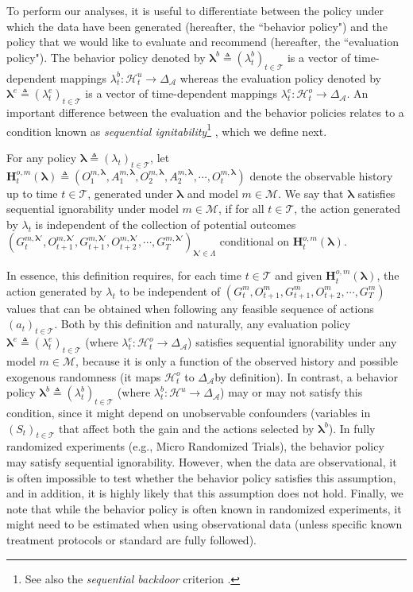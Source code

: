 \documentclass[opre,nonblindrev]{informs2}%
\newcommand{\teq}{\triangleq}
\newcommand{\1}{\hbox{\rm 1\kern-.35em 1}}
\newcommand{\MA}{\mathscr A}
\newcommand{\MT}{\mathscr T}
\newcommand{\MM}{\mathscr M}
\newcommand{\MH}{\mathscr H}
\newcommand{\blambda}{\boldsymbol{\lambda}}
\newcommand{\bH}{\mathbf{H}}
\begin{document}
To perform our analyses,  it is useful to differentiate between the policy under which the data have been generated (hereafter, the ``behavior policy") and the policy that we would like to evaluate and recommend (hereafter, the ``evaluation policy"). The behavior policy denoted by $\blambda^b\teq(\lambda_t^b)_{t\in\MT}$  is  a vector of time-dependent mappings $\lambda_t^b: \MH^u_t\to\Delta_\MA$ whereas the evaluation policy denoted by $\blambda^e\teq(\lambda_t^e)_{t\in\MT}$  is  a vector of time-dependent mappings $\lambda_t^e: \MH^o_t\to\Delta_\MA$. An important difference between the evaluation and the behavior policies relates to a condition known as {\em sequential ignitability}\footnote{See also the {\em sequential backdoor} criterion \citep{PearlRobins1995}.} \citep[see, e.g.,][]{Robins1986, Robins1997, Murphy2001, Murphy2003, Robins2004}, which we define next.



\begin{definition} For any policy $\blambda\teq(\lambda_t)_{t\in\MT}$, let $\bH^{o,m}_t (\blambda)\teq(O^{m, \blambda}_1, A^{m, \blambda}_1, O^{m, \blambda}_2, A^{m, \blambda}_2,\cdots, O^{m, \blambda}_t)$ denote the observable history up to time  $t\in\MT$, generated under  $\blambda$ and model $m\in\MM$.  We say that $\blambda$ satisfies sequential ignorability under model $m\in\MM$, if for all $t\in\MT$, the action generated
by $\lambda_t$ is independent of the collection of potential outcomes $(G^{m, \blambda'}_{t}, O^{m, \blambda'}_{t+1}, G^{m, \blambda'}_{t+1}, O^{m, \blambda'}_{t+2}, \cdots, G^{m, \blambda'}_{T})_{\blambda'\in\Lambda}$ conditional on $\bH^{o,m}_t (\blambda)$.
\end{definition}

In essence, this definition requires, for each time $t\in\MT$ and given $\bH^{o,m}_t (\blambda)$,   the action generated by $\lambda_t$ to be independent of $(G^{m}_{t}, O^{m}_{t+1}, G^{m}_{t+1}, O^{m}_{t+2}, \cdots, G^{m}_{T})$ values that can be obtained when following any feasible sequence of actions $(a_t)_{t\in\MT}$. Both by this definition and naturally,  any evaluation policy  $\blambda^e\teq(\lambda_t^e)_{t\in\MT}$ (where $\lambda_t^e: \MH^o_t\to\Delta_\MA$) satisfies sequential ignorability under any model $m\in\MM$, because it is only a function of the observed history and possible exogenous randomness (it maps $\MH^o_t$ to $\Delta_\MA$by definition).  In contrast, a behavior policy $\blambda^b\teq(\lambda_t^b)_{t\in\MT}$ (where $\lambda_t^b: \MH^u\to\Delta_\MA$)  may or may not satisfy this condition, since it might depend on unobservable confounders (variables in $(S_t)_{t\in\MT}$ that affect both the gain and the actions selected by $\blambda^b$). In fully randomized experiments (e.g., Micro Randomized Trials), the behavior policy  may satisfy sequential ignorability. However, when the data are observational, it is often impossible to test whether the behavior policy satisfies this assumption, and in addition, it is  highly likely that this assumption does not hold. Finally, we note that while the behavior policy is often known in randomized experiments, it might need to be estimated when using observational data (unless specific known treatment protocols or standard are fully followed).
\end{document}
